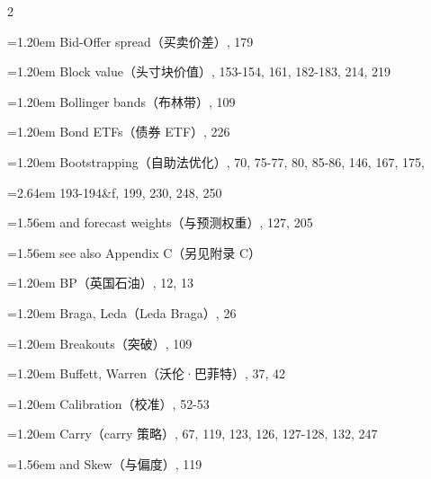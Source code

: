 {\begin{multicols}{2}
\par \noindent\hangindent=1.20em\hspace*{0.00em} Bid-Offer spread（买卖价差）, 179
\par \noindent\hangindent=1.20em\hspace*{0.00em} Block value（头寸块价值）, 153-154, 161, 182-183, 214, 219
\par \noindent\hangindent=1.20em\hspace*{0.00em} Bollinger bands（布林带）, 109
\par \noindent\hangindent=1.20em\hspace*{0.00em} Bond ETFs（债券 ETF）, 226
\par \noindent\hangindent=1.20em\hspace*{0.00em} Bootstrapping（自助法优化）, 70, 75-77, 80, 85-86, 146, 167, 175,
\par \noindent\hangindent=2.64em\hspace*{1.44em} 193-194\&f, 199, 230, 248, 250
\par \noindent\hangindent=1.56em\hspace*{0.36em} and forecast weights（与预测权重）, 127, 205
\par \noindent\hangindent=1.56em\hspace*{0.36em} see also Appendix C（另见附录 C）
\par \noindent\hangindent=1.20em\hspace*{0.00em} BP（英国石油）, 12, 13
\par \noindent\hangindent=1.20em\hspace*{0.00em} Braga, Leda（Leda Braga）, 26
\par \noindent\hangindent=1.20em\hspace*{0.00em} Breakouts（突破）, 109
\par \noindent\hangindent=1.20em\hspace*{0.00em} Buffett, Warren（沃伦·巴菲特）, 37, 42
\par \noindent\hangindent=1.20em\hspace*{0.00em} Calibration（校准）, 52-53
\par \noindent\hangindent=1.20em\hspace*{0.00em} Carry（carry 策略）, 67, 119, 123, 126, 127-128, 132, 247
\par \noindent\hangindent=1.56em\hspace*{0.36em} and Skew（与偏度）, 119

\end{multicols}}
